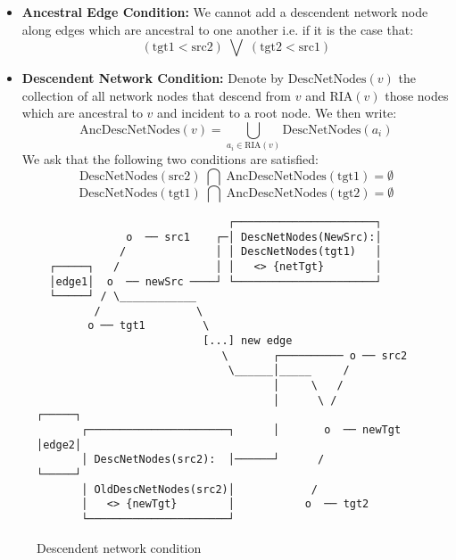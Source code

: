 \documentclass[11pt]{article}
\begin{document}
\begin{itemize}

\item \textbf{Ancestral Edge Condition: }We cannot add  a descendent network node along edges which are ancestral to one another i.e. if it is the case that:
  \[ (\mathrm{tgt1} < \mathrm{src2})\; \bigvee \; (\mathrm{tgt2} < \mathrm{src1}) \]

\item \textbf{Descendent Network Condition: }Denote by $\mathrm{DescNetNodes}(v)$ the collection of all network nodes that descend from $v$ and $\mathrm{RIA}(v)$ those nodes which are ancestral to $v$ and incident to a root node. We then write:
\[ \mathrm{AncDescNetNodes}(v) = \bigcup_{a_{i}\in \mathrm{RIA}(v)} \mathrm{DescNetNodes} (a_i) \]
We ask that the following two conditions are satisfied:
\[ \mathrm{DescNetNodes}(\mathrm{src2})\; \bigcap \;\mathrm{AncDescNetNodes}(\mathrm{tgt1}) = \emptyset \]
\[ \mathrm{DescNetNodes}(\mathrm{tgt1})\; \bigcap \;\mathrm{AncDescNetNodes}(\mathrm{tgt2}) = \emptyset  \]

\end{itemize}

\begin{figure}[H]
  \begin{verbatim}
                              ┌──────────────────────┐
              o  ── src1    ┌─│ DescNetNodes(NewSrc):│
             /              │ │ DescNetNodes(tgt1)   │
  ┌─────┐   /               │ │   <> {netTgt}        │
  │edge1│  o  ── newSrc ────┘ └──────────────────────┘
  └─────┘ / \____________    
         /               \
        o ── tgt1         \
                          [...] new edge
                             \       ┌────────── o ── src2
                              \______│_____     /
                                     │     \   /
                                     │      \ /           ┌─────┐
       ┌──────────────────────┐      │       o  ── newTgt │edge2│
       │ DescNetNodes(src2):  │──────┘      /             └─────┘
       │ OldDescNetNodes(src2)│            /
       │   <> {newTgt}        │           o  ── tgt2
       └──────────────────────┘ 
  \end{verbatim}
\caption{Descendent network condition}
\end{figure}

\newpage
\end{document}
